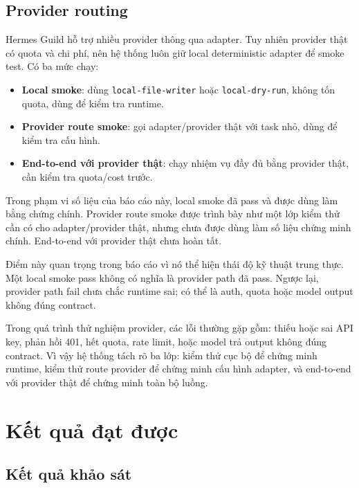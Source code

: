 \documentclass[12pt,a4paper]{article}
\begin{document}
\subsection{Provider routing}

Hermes Guild hỗ trợ nhiều provider thông qua adapter. Tuy nhiên provider thật có quota và chi phí, nên hệ thống luôn giữ local deterministic adapter để smoke test. Có ba mức chạy:

\begin{itemize}
    \item \textbf{Local smoke}: dùng \texttt{local-file-writer} hoặc \texttt{local-dry-run}, không tốn quota, dùng để kiểm tra runtime.
    \item \textbf{Provider route smoke}: gọi adapter/provider thật với task nhỏ, dùng để kiểm tra cấu hình.
    \item \textbf{End-to-end với provider thật}: chạy nhiệm vụ đầy đủ bằng provider thật, cần kiểm tra quota/cost trước.
\end{itemize}

Trong phạm vi số liệu của báo cáo này, local smoke đã pass và được dùng làm bằng chứng chính. Provider route smoke được trình bày như một lớp kiểm thử cần có cho adapter/provider thật, nhưng chưa được dùng làm số liệu chứng minh chính. End-to-end với provider thật chưa hoàn tất.

Điểm này quan trọng trong báo cáo vì nó thể hiện thái độ kỹ thuật trung thực. Một local smoke pass không có nghĩa là provider path đã pass. Ngược lại, provider path fail chưa chắc runtime sai; có thể là auth, quota hoặc model output không đúng contract.

Trong quá trình thử nghiệm provider, các lỗi thường gặp gồm: thiếu hoặc sai API key, phản hồi 401, hết quota, rate limit, hoặc model trả output không đúng contract. Vì vậy hệ thống tách rõ ba lớp: kiểm thử cục bộ để chứng minh runtime, kiểm thử route provider để chứng minh cấu hình adapter, và end-to-end với provider thật để chứng minh toàn bộ luồng.

\section{Kết quả đạt được}

\subsection{Kết quả khảo sát}
\end{document}
